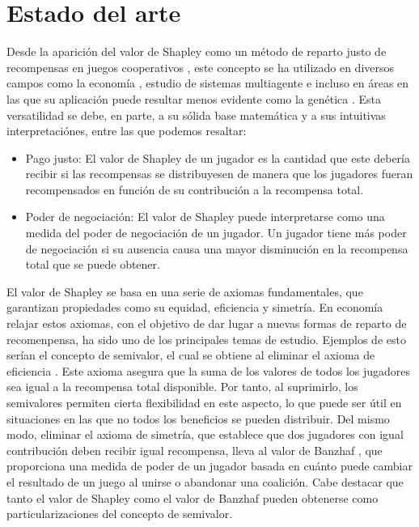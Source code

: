 \chapter{Estado del arte}
\label{estadoDelArte}
\justifying
Desde la aparición del valor de Shapley como un método de reparto
justo de recompensas en juegos cooperativos \cite{shapleyValue},
este concepto se ha utilizado en diversos campos como la
economía \cite{libroShapley}, estudio de sistemas multiagente
\cite{fatima} e incluso en áreas en las que su aplicación
puede resultar menos evidente como la genética
\cite{genes}. Esta versatilidad se debe, en parte, a su 
sólida base matemática y a sus intuitivas interpretaciónes,
entre las que podemos resaltar:

\begin{itemize}
  \item Pago justo: El valor de Shapley de un jugador es la cantidad
  que este debería recibir si las recompensas se distribuyesen de
  manera que los jugadores fueran recompensados en función de su
  contribución a la recompensa total.

  \item Poder de negociación: El valor de Shapley puede
  interpretarse como una medida del poder de negociación de un jugador.
  Un jugador tiene más poder de negociación si su ausencia causa
  una mayor disminución en la recompensa total que se puede obtener.
\end{itemize}

El valor de Shapley se basa en una serie de axiomas fundamentales,
que garantizan propiedades como su equidad, eficiencia y simetría.
En economía relajar estos axiomas, con el objetivo de dar lugar
a nuevas formas de reparto de recomenpensa, ha sido uno de
los principales temas de estudio. Ejemplos de esto serían el
concepto de semivalor, el cual se obtiene al eliminar el
axioma de eficiencia \cite{Dubey, Dubey2}.
Este axioma asegura que la suma de los valores de
todos los jugadores sea igual a la recompensa total disponible.
Por tanto, al suprimirlo, los semivalores permiten cierta
flexibilidad en este aspecto, lo que puede ser útil en
situaciones en las que no todos los beneficios se pueden distribuir.
Del mismo modo, eliminar el axioma de simetría, que
establece que dos jugadores con igual contribución deben recibir
igual recompensa, lleva al valor de Banzhaf \cite{banzhaf},
que proporciona una medida de poder de un jugador basada
en cuánto puede cambiar el resultado de un juego al unirse o
abandonar una coalición. Cabe destacar que tanto el valor de
Shapley como el valor de Banzhaf pueden obtenerse como
particularizaciones del concepto de semivalor.

